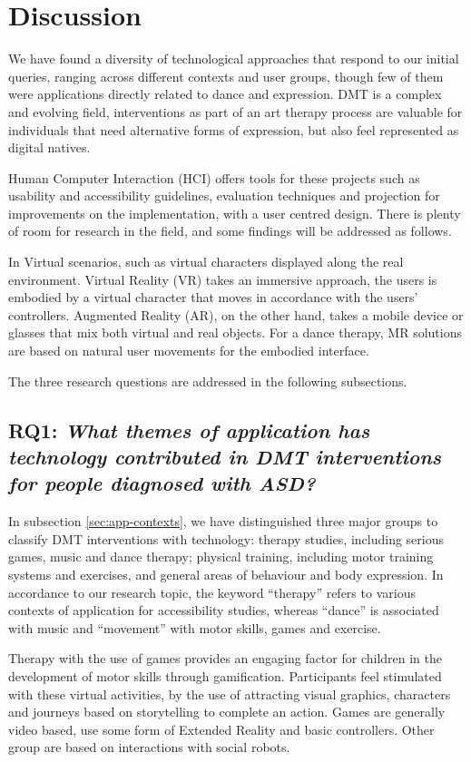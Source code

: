 \documentclass[a4paper,fleqn]{cas-sc}
\begin{document}
\section{Discussion} 
\label{sec5:discussion}
We have found a diversity of technological approaches that respond to our initial queries, ranging across different contexts and user groups, though few of them were applications directly related to dance and expression. DMT is a complex and evolving field, interventions as part of an art therapy process are valuable for individuals that need alternative forms of expression, but also feel represented as digital natives.

Human Computer Interaction (HCI) offers tools for these projects such as usability and accessibility guidelines, evaluation techniques and projection for improvements on the implementation, with a user centred design. There is plenty of room for research in the field, and some findings will be addressed as follows.

In Virtual scenarios, such as virtual characters displayed along the real environment. Virtual Reality (VR) takes an immersive approach, the users is embodied by a virtual character that moves in accordance with the users’ controllers. Augmented Reality (AR), on the other hand, takes a mobile device or glasses that mix both virtual and real objects. For a dance therapy, MR solutions are based on natural user movements for the embodied interface.

The three research questions are addressed in the following subsections.

\subsection{RQ1: \emph{What themes of application has technology contributed in DMT interventions for people diagnosed with ASD?}}

In subsection \ref{sec:app-contexts}, we have distinguished three major groups to classify DMT interventions with technology: therapy studies, including serious games, music and dance therapy; physical training, including motor training systems and exercises, and general areas of behaviour and body expression.
In accordance to our research topic, the keyword ``therapy'' refers to various contexts of application for accessibility studies, whereas ``dance'' is associated with music and ``movement'' with motor skills, games and exercise.


Therapy with the use of games provides an engaging factor for children in the development of motor skills through gamification. Participants feel stimulated with these virtual activities, by the use of attracting visual graphics, characters and journeys based on storytelling to complete an action. Games are generally video based, use some form of Extended Reality and basic controllers. Other group are based on interactions with social robots.
\end{document}
